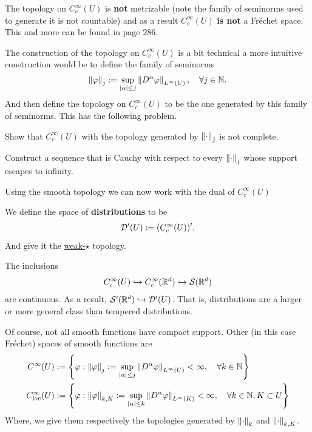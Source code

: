 \documentclass[
    a4paper,
    DIV=14,
    abstract=true,
    numbers=noenddot
]{scrartcl}
\begin{document}
\begin{observation}
	The topology on $C_c^\infty(U)$ is \textbf{not} metrizable (note the family of seminorms used to generate it is not countable) and as a result $C_c^\infty(U)$ \textbf{is not} a Fréchet space. This and more can be found in \cite{leoni2017first} page 286.
\end{observation}
The construction of the topology on $C_c^\infty(U)$ is a bit technical a more intuitive construction would be to define the family of seminorms
\begin{align*}
	\left\lVert \varphi \right\rVert_j := \sup_{{\left| \alpha \right|} \leq j}  \left\lVert D^\alpha \varphi \right\rVert_{L^\infty(U)} ,\quad \forall j \in \mathbb{N}.
\end{align*}
And then define the topology on $C_c^\infty(U)$ to be the one generated by this family of seminorms. This has the following problem.
\begin{exercise}
	Show that $C_c^\infty(U)$ with the topology generated by $\left\lVert \cdot  \right\rVert_j$ is not complete.
\end{exercise}
\begin{hint}
	Construct a  sequence that is Cauchy with respect to every $\left\lVert \cdot  \right\rVert_j$ whose support escapes to infinity.
\end{hint}
Using the smooth topology we can now work with the dual of $C_c^\infty(U)$
\begin{definition}
	We define the space of \textbf{distributions} to be
	\begin{align*}
		\mathcal{D}'(U):= (C_c^\infty(U))'.
	\end{align*}
	And give it the \href{https://en.wikipedia.org/wiki/Weak_topology}{weak-$\star$} topology.
\end{definition}
\begin{observation}
	The inclusions
	\begin{align*}
		C_c^\infty(U) \hookrightarrow C_c^\infty(\mathbb{R}^d) \hookrightarrow \mathcal{S}(\mathbb{R}^d)
	\end{align*}
	are continuous. As a result, $\mathcal{S}'(\mathbb{R}^d) \hookrightarrow \mathcal{D}'(U)$. That is, distributions are a larger or more general class than tempered distributions.
\end{observation}
Of course, not all smooth functions have compact support. Other (in this case Fréchet) spaces of smooth functions are
\begin{align*}
	C^\infty(U)                & :=\left\{\varphi: \left\lVert \varphi \right\rVert_j:= \sup_{{\left| \alpha \right|} \leq j}  \left\lVert D^\alpha \varphi \right\rVert_{L^\infty(U)}<\infty,\quad \forall k \in \mathbb{N} \right\}                  \\
	C^\infty_{\mathrm{loc}}(U) & :=\left\{\varphi: \left\lVert \varphi \right\rVert_{k,K}:= \sup_{{\left| \alpha \right|} \leq k}  \left\lVert D^\alpha \varphi \right\rVert_{L^\infty(K)}<\infty,\quad \forall k \in \mathbb{N}, K \subset U \right\}
\end{align*}
Where, we give them respectively the topologies generated by $\left\lVert \cdot \right\rVert_k$ and $\left\lVert \cdot \right\rVert_{k,K}$.
\end{document}

